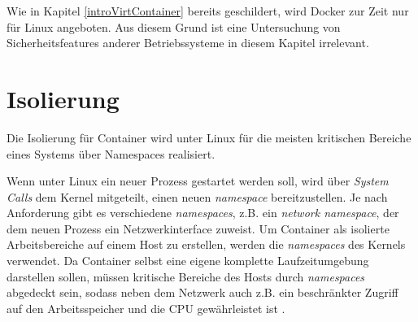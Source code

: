 \documentclass[../main.tex]{subfiles}
\begin{document}



	Wie in Kapitel \ref{introVirtContainer} bereits geschildert, wird Docker zur Zeit nur für Linux angeboten. Aus diesem Grund ist eine Untersuchung von Sicherheitsfeatures anderer Betriebssysteme in diesem Kapitel irrelevant.




	\section{Isolierung}
  \label{secIsolierung}
		Die Isolierung für Container wird unter Linux für die meisten kritischen Bereiche eines Systems über Namespaces realisiert.

		Wenn unter Linux ein neuer Prozess gestartet werden soll, wird über \emph{System Calls} dem Kernel mitgeteilt, einen neuen \emph{namespace} bereitzustellen. Je nach Anforderung gibt es verschiedene \emph{namespaces}, z.B. ein \emph{network namespace}, der dem neuen Prozess ein Netzwerkinterface zuweist. Um Container als isolierte Arbeitsbereiche auf einem Host zu erstellen, werden die \emph{namespaces} des Kernels verwendet. Da Container selbst eine eigene komplette Laufzeitumgebung darstellen sollen, müssen kritische Bereiche des Hosts durch \emph{namespaces} abgedeckt sein, sodass neben dem Netzwerk auch z.B. ein beschränkter Zugriff auf den Arbeitsspeicher und die \acrshort{CPU} gewährleistet ist \cite[S.3]{dockerIntroIEEE}.
\end{document}
